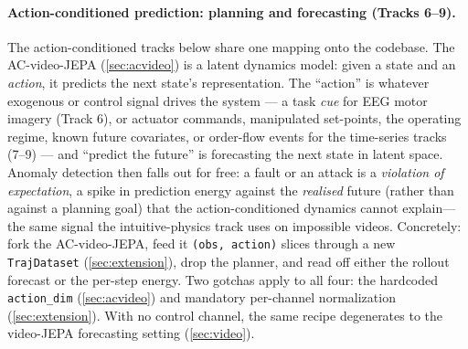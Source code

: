 \documentclass{article}
\newcommand{\code}[1]{\texttt{\small #1}}
\begin{document}
\paragraph{Action-conditioned prediction: planning and forecasting (Tracks 6--9).}
The action-conditioned tracks below share one mapping onto the codebase. The
AC-video-JEPA (\cref{sec:acvideo}) is a latent dynamics model: given a state and an
\emph{action}, it predicts the next state's representation. The ``action'' is
whatever exogenous or control signal drives the system --- a task \emph{cue} for EEG
motor imagery (Track 6), or actuator commands, manipulated set-points, the operating
regime, known future covariates, or order-flow events for the time-series tracks
(7--9) --- and ``predict the future'' is forecasting the next state in latent space. Anomaly detection then falls out for
free: a fault or an attack is a \emph{violation of expectation}, a spike in
prediction energy against the \emph{realised} future (rather than against a
planning goal) that the action-conditioned dynamics cannot explain---the same
signal the intuitive-physics track uses on impossible videos. Concretely: fork
the AC-video-JEPA, feed it \code{(obs, action)} slices through a new
\code{TrajDataset} (\cref{sec:extension}), drop the planner, and read off either
the rollout forecast or the per-step energy. Two gotchas apply to all four: the
hardcoded \code{action\_dim} (\cref{sec:acvideo}) and mandatory per-channel
normalization (\cref{sec:extension}). With no control channel, the same recipe
degenerates to the video-JEPA forecasting setting (\cref{sec:video}).
\end{document}
